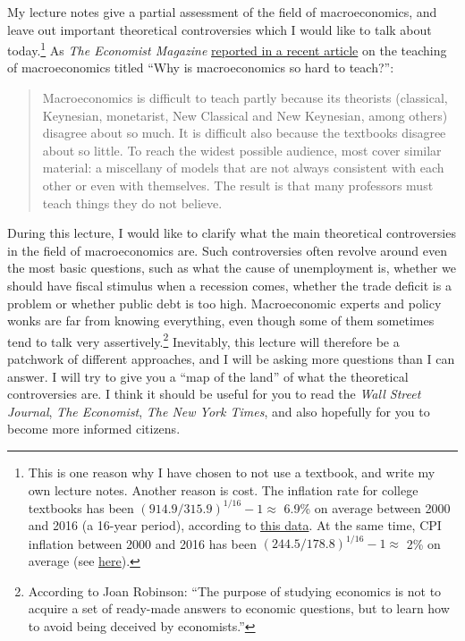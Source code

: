 \documentclass[]{book}
\let\rmarkdownfootnote\footnote%
\def\footnote{\protect\rmarkdownfootnote}
\begin{document}
My lecture notes give a partial assessment of the field of
macroeconomics, and leave out important theoretical controversies which
I would like to talk about today.\footnote{This is one reason why I have
  chosen to not use a textbook, and write my own lecture notes. Another
  reason is cost. The inflation rate for college textbooks has been
  \((914.9/315.9)^{1/16}-1 \approx\) 6.9\% on average between 2000 and
  2016 (a 16-year period), according to
  \href{https://db.nomics.world/BLS/pc/PCU511130511130F21}{this data}.
  At the same time, CPI inflation between 2000 and 2016 has been
  \((244.5/178.8)^{1/16}-1 \approx\) 2\% on average (see
  \href{https://db.nomics.world/BLS/cu/CUUR0000SA0L1E}{here}).} As
\emph{The Economist Magazine}
\href{https://www.economist.com/finance-and-economics/2018/08/09/why-is-macroeconomics-so-hard-to-teach}{reported
in a recent article} on the teaching of macroeconomics titled ``Why is
macroeconomics so hard to teach?'':

\begin{quote}
Macroeconomics is difficult to teach partly because its theorists
(classical, Keynesian, monetarist, New Classical and New Keynesian,
among others) disagree about so much. It is difficult also because the
textbooks disagree about so little. To reach the widest possible
audience, most cover similar material: a miscellany of models that are
not always consistent with each other or even with themselves. The
result is that many professors must teach things they do not believe.
\end{quote}

During this lecture, I would like to clarify what the main theoretical
controversies in the field of macroeconomics are. Such controversies
often revolve around even the most basic questions, such as what the
cause of unemployment is, whether we should have fiscal stimulus when a
recession comes, whether the trade deficit is a problem or whether
public debt is too high. Macroeconomic experts and policy wonks are far
from knowing everything, even though some of them sometimes tend to talk
very assertively.\footnote{According to Joan Robinson: ``The purpose of
  studying economics is not to acquire a set of ready-made answers to
  economic questions, but to learn how to avoid being deceived by
  economists.''} Inevitably, this lecture will therefore be a patchwork
of different approaches, and I will be asking more questions than I can
answer. I will try to give you a ``map of the land'' of what the
theoretical controversies are. I think it should be useful for you to
read the \emph{Wall Street Journal}, \emph{The Economist}, \emph{The New
York Times}, and also hopefully for you to become more informed
citizens.
\end{document}
